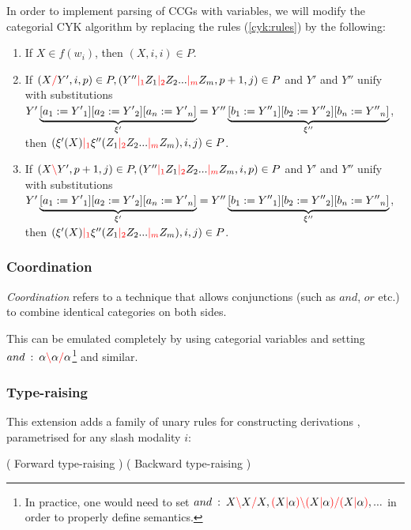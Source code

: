 \documentclass[main.tex]{subfiles}
\begin{document}
In order to implement parsing of CCGs with variables, we will modify the categorial
CYK algorithm by replacing the rules (\cref{cyk:rules}) by the following:

\begin{enumerate}
    \item If $X \in f(w_i)$, then $(X, i, i) \in P$.
    \item If $(X \textcolor{red}{/} Y', i, p) \in P, (Y'' \textcolor{red}{|_{1}} Z_1 \textcolor{red}{|_{2}} Z_2 ... \textcolor{red}{|_{m}} Z_m, p + 1, j) \in P$
        and $Y'$ and $Y''$ unify with substitutions
        $ {Y'} \underbrace{ [ a_1 := {Y'}_1 ] [ a_2 := {Y'}_2 ] [ a_n := {Y'}_n ]}_{\xi'}
        = {Y''}\underbrace{ [ b_1 := {Y''}_1 ] [ b_2 := {Y''}_2 ] [ b_n := {Y''}_n ]}_{\xi''}$, \\
        then $(\xi'(X) \textcolor{red}{|_{1}} \xi''(Z_1 \textcolor{red}{|_{2}} Z_2 ... \textcolor{red}{|_{m}} Z_m), i, j) \in P$.
    \item If $(X \textcolor{red}{\backslash} Y', p + 1, j) \in P, (Y'' \textcolor{red}{|_{1}} Z_1 \textcolor{red}{|_{2}} Z_2 ... \textcolor{red}{|_{m}} Z_m, i, p) \in P$
        and $Y'$ and $Y''$ unify with substitutions
        $ {Y'} \underbrace{ [ a_1 := {Y'}_1 ] [ a_2 := {Y'}_2 ] [ a_n := {Y'}_n ]}_{\xi'}
        = {Y''}\underbrace{ [ b_1 := {Y''}_1 ] [ b_2 := {Y''}_2 ] [ b_n := {Y''}_n ]}_{\xi''}$, \\
        then $(\xi'(X) \textcolor{red}{|_{1}} \xi''(Z_1 \textcolor{red}{|_{2}} Z_2 ... \textcolor{red}{|_{m}} Z_m), i, j) \in P$.
\end{enumerate}

\subsubsection{Coordination}
\emph{Coordination} refers to a technique that allows conjunctions (such as
$and$, $or$ etc.) to combine identical categories on both sides.

This can be emulated completely by using categorial variables and setting
$and \hspace{0.5em} {:} \hspace{0.5em} \alpha \textcolor{red}{\backslash} \alpha \textcolor{red}{/} \alpha $\footnote{
    In practice, one would need to set
    $and \hspace{0.5em} {:} \hspace{0.5em} X \textcolor{red}{\backslash} X \textcolor{red}{/} X, \textcolor{red}{(} X \textcolor{red}{|} \alpha \textcolor{red}{)} \textcolor{red}{\backslash} \textcolor{red}{(} X \textcolor{red}{|} \alpha \textcolor{red}{)} \textcolor{red}{/} \textcolor{red}{(} X \textcolor{red}{|} \alpha \textcolor{red}{)}, ...$
    in order to properly define semantics.
} and similar.

\subsubsection{Type-raising}
This extension adds a family of unary rules for constructing derivations \cite[sec.~5.3.1]{nts},
parametrised for any slash modality $i$:
\begin{center}
        ( Forward type-raising )
        ( Backward type-raising )
\end{center}
\end{document}
